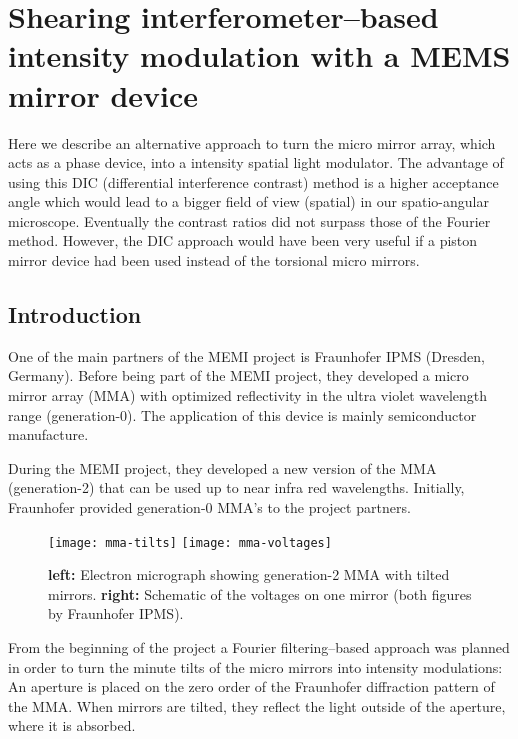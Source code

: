 \chapter{Shearing interferometer--based intensity modulation with a
  MEMS mirror device}
\label{sec:app_dic}
\lstset{language=Maxima}
\begin{summary}
  Here we describe an alternative approach to turn the micro mirror
  array, which acts as a phase device, into a intensity spatial light
  modulator. The advantage of using this DIC (differential
  interference contrast) method is a higher acceptance angle which
  would lead to a bigger field of view (spatial) in our spatio-angular
  microscope. Eventually the contrast ratios did not surpass those of
  the Fourier method. However, the DIC approach would have been very
  useful if a piston mirror device had been used instead of the
  torsional micro mirrors.
\end{summary}
\section{Introduction}
One of the main partners of the MEMI project is Fraunhofer IPMS
(Dresden, Germany). Before being part of the MEMI project, they
developed a micro mirror array (MMA) with optimized reflectivity in
the ultra violet wavelength range (generation-0). The application of
this device is mainly semiconductor manufacture.

During the MEMI project, they developed a new version of the MMA
(generation-2) that can be used up to near infra red
wavelengths. Initially, Fraunhofer provided generation-0 MMA's to the
project partners.
\begin{figure}[htbp]
  \centering
  \texttt{[image: mma-tilts]}
  \texttt{[image: mma-voltages]}
  \caption{{\bf left:} Electron micrograph showing generation-2 MMA
    with tilted mirrors. {\bf right:} Schematic of the voltages on one
    mirror (both figures by Fraunhofer IPMS).}
  \label{fig:mma-tilts}
\end{figure}
From the beginning of the project a Fourier filtering--based approach
was planned in order to turn the minute tilts of the micro mirrors
into intensity modulations: An aperture is placed on the zero order of
the Fraunhofer diffraction pattern of the MMA. When mirrors are
tilted, they reflect the light outside of the aperture, where it is
absorbed.

